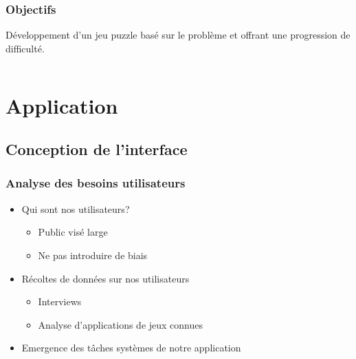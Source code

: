 \documentclass{beamer}
\begin{document}
\begin{frame}
\frametitle{Objectifs}
\begin{center}
Développement d'un jeu puzzle basé sur le problème et offrant une progression de difficulté.\\[0.5cm]
\end{center}
\begin{columns}
\centering
\begin{column}{.49\textwidth}
\end{column}
\begin{column}{0.49\textwidth}
\end{column}
\end{columns}
\end{frame}

\section{Application}

\subsection{Conception de l'interface}
\begin{frame}
\frametitle{Analyse des besoins utilisateurs}
\begin{itemize}
	\item Qui sont nos utilisateurs?
    \begin{itemize}
    	\item Public visé large
        \item Ne pas introduire de biais
    \end{itemize}
    \item Récoltes de données sur nos utilisateurs
    \begin{itemize}
    	\item Interviews
        \item Analyse d'applications de jeux connues
    \end{itemize}
    \item Emergence des tâches systèmes de notre application
\end{itemize}
\end{frame}
\end{document}
